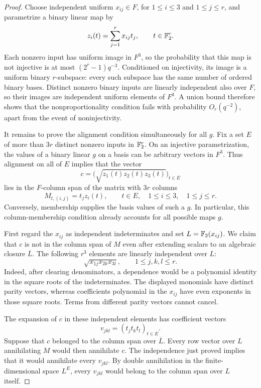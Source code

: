 \begin{proof}
Choose independent uniform $x_{ij}\in F$, for $1\le i\le3$ and
$1\le j\le r$, and parametrize a binary linear map by
\[
 z_i(t)=\sum_{j=1}^r x_{ij}t_j,
 \qquad t\in\mathbb F_2^r.
\]
Each nonzero input has uniform image in $F^3$, so the probability that this
map is not injective is at most $(2^r-1)q^{-3}$.  Conditioned on
injectivity, its image is a uniform binary $r$-subspace: every such
subspace has the same number of ordered binary bases.  Distinct nonzero
binary inputs are linearly independent also over $F$, so their images are
independent uniform elements of $F^3$.  A union bound therefore shows that
the nonproportionality condition fails with probability $O_r(q^{-2})$,
apart from the event of noninjectivity.

It remains to prove the alignment condition simultaneously for all $g$.
Fix a set $E$ of more than $3r$ distinct nonzero inputs in $\mathbb F_2^r$.
On an injective parametrization, the values of a binary linear $g$ on a
basis can be arbitrary vectors in $F^3$.  Thus alignment on all of $E$
implies that the vector
\[
 c=\bigl(\sqrt{z_1(t)z_2(t)z_3(t)}\bigr)_{t\in E}
\]
lies in the $F$-column span of the matrix with $3r$ columns
\[
 M_{t,(i,j)}=t_jz_i(t),
 \qquad t\in E,\quad 1\le i\le3,\quad 1\le j\le r.
\]
Conversely, membership supplies the basis values of such a $g$.
In particular, this column-membership condition already accounts for all
possible maps $g$.

First regard the $x_{ij}$ as independent indeterminates and set
$L=\mathbb F_2(x_{ij})$.  We claim that $c$ is not in the column span of $M$ even
after extending scalars to an algebraic closure $\overline L$.
The following $r^3$ elements are linearly independent over $L$:
\[
 \sqrt{x_{1j}x_{2k}x_{3l}},
 \qquad 1\le j,k,l\le r.
\]
Indeed, after clearing denominators, a dependence would be a polynomial
identity in the square roots of the
indeterminates.  The displayed monomials have distinct parity vectors,
whereas coefficients polynomial in the $x_{ij}$ have even exponents in
those square roots.  Terms from different parity vectors cannot cancel.

The expansion of $c$ in these independent elements has coefficient vectors
\[
 v_{jkl}=(t_jt_kt_l)_{t\in E}.
\]
Suppose that $c$ belonged to the column span over $\overline L$.
Every row vector over $L$ annihilating $M$ would then annihilate $c$.
The independence just proved implies that it would annihilate every
$v_{jkl}$.  By double annihilation in the finite-dimensional space
$L^E$, every $v_{jkl}$ would belong to the column span over $L$ itself.


\end{proof}
